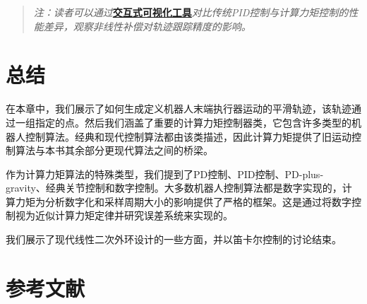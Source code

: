 \documentclass[UTF8]{ctexart}
\theoremstyle{definition}
\begin{document}
\begin{quote}
\textit{注：读者可以通过}\href{https://frankjie09.github.io/Robot-Manipulator-Control-CN/figures/Computed_Torque_Control.html}{\textbf{交互式可视化工具}}\textit{对比传统PID控制与计算力矩控制的性能差异，观察非线性补偿对轨迹跟踪精度的影响。}
\end{quote}

\section{总结}

在本章中，我们展示了如何生成定义机器人末端执行器运动的平滑轨迹，该轨迹通过一组指定的点。然后我们涵盖了重要的计算力矩控制器类，它包含许多类型的机器人控制算法。经典和现代控制算法都由该类描述，因此计算力矩提供了旧运动控制算法与本书其余部分更现代算法之间的桥梁。

作为计算力矩算法的特殊类型，我们提到了PD控制、PID控制、PD-plus-gravity、经典关节控制和数字控制。大多数机器人控制算法都是数字实现的，计算力矩为分析数字化和采样周期大小的影响提供了严格的框架。这是通过将数字控制视为近似计算力矩定律并研究误差系统来实现的。

我们展示了现代线性二次外环设计的一些方面，并以笛卡尔控制的讨论结束。

\newpage
\section*{参考文献}
\end{document}
